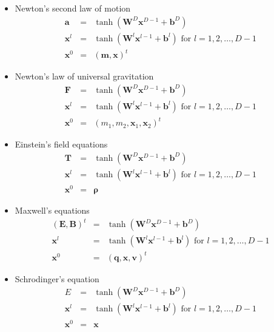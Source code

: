 \documentclass{article}
\newcommand{\bvec}[1]{\mathbf{#1}}
\begin{document}
\thispagestyle{empty}

\begin{itemize}
\item Newton's second law of motion
\begin{eqnarray}
\bvec{a} &=& \tanh(\bvec{W}^D\bvec{x}^{D-1} + \bvec{b}^D)
\nonumber \\
\bvec{x}^l &=& \tanh(\bvec{W}^l\bvec{x}^{l-1} + \bvec{b}^l) 
\text{ for } l=1,2,\dots, D-1
\nonumber \\
\bvec{x}^0 &=& ( \bvec{m}, \bvec{x} )^t
\end{eqnarray}

\item Newton's law of universal gravitation
\begin{eqnarray}
\bvec{F} &=& \tanh(\bvec{W}^D\bvec{x}^{D-1} + \bvec{b}^D)
\nonumber \\
\bvec{x}^l &=& \tanh(\bvec{W}^l\bvec{x}^{l-1} + \bvec{b}^l) 
\text{ for } l=1,2,\dots, D-1
\nonumber \\
\bvec{x}^0 &=& (m_1, m_2, \bvec{x}_1, \bvec{x}_2)^t
\end{eqnarray}

\item Einstein's field equations
\begin{eqnarray}
\bvec{T} &=& \tanh(\bvec{W}^D\bvec{x}^{D-1} + \bvec{b}^D)
\nonumber \\
\bvec{x}^l &=& \tanh(\bvec{W}^l\bvec{x}^{l-1} + \bvec{b}^l) 
\text{ for } l=1,2,\dots, D-1
\nonumber \\
\bvec{x}^0 &=& \bvec{\rho}
\end{eqnarray}

\item Maxwell's equations
\begin{eqnarray}
(\bvec{E}, \bvec{B})^t &=& \tanh(\bvec{W}^D\bvec{x}^{D-1} + \bvec{b}^D)
\nonumber \\
\bvec{x}^l &=& \tanh(\bvec{W}^l\bvec{x}^{l-1} + \bvec{b}^l) 
\text{ for } l=1,2,\dots, D-1
\nonumber \\
\bvec{x}^0 &=& (\bvec{q}, \bvec{x}, \bvec{v})^t
\end{eqnarray}

\item Schrodinger's equation
\begin{eqnarray}
E &=& \tanh(\bvec{W}^D\bvec{x}^{D-1} + \bvec{b}^D)
\nonumber \\
\bvec{x}^l &=& \tanh(\bvec{W}^l\bvec{x}^{l-1} + \bvec{b}^l) 
\text{ for } l=1,2,\dots, D-1
\nonumber \\
\bvec{x}^0 &=& \bvec{x}
\end{eqnarray}


\end{itemize}
\end{document}
